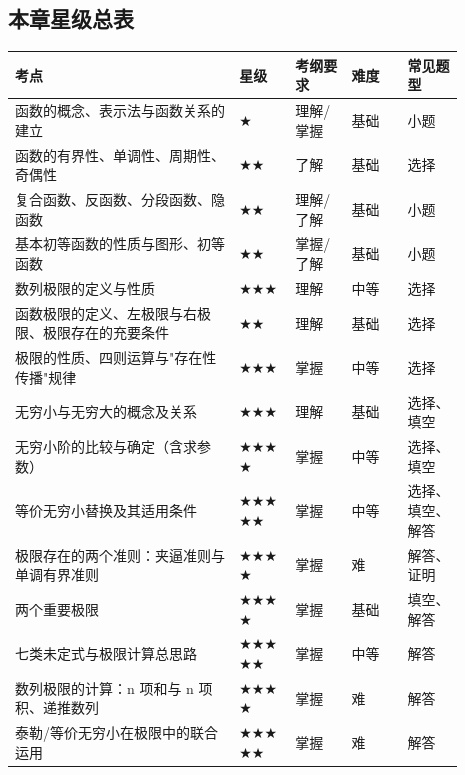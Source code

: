 \documentclass[11pt,openany,UTF8]{ctexbook}
\begin{document}
\subsection*{本章星级总表}

\begingroup\small\setlength{\tabcolsep}{4.0pt}
\begin{longtable}{@{}L{0.4484\linewidth}L{0.1114\linewidth}L{0.1114\linewidth}L{0.1114\linewidth}L{0.1114\linewidth}@{}}
\toprule
\textbf{考点} & \textbf{星级} & \textbf{考纲要求} & \textbf{难度} & \textbf{常见题型} \\
\midrule
\endhead
函数的概念、表示法与函数关系的建立 & $\bigstar$ & 理解/掌握 & 基础 & 小题 \\
函数的有界性、单调性、周期性、奇偶性 & $\bigstar$$\bigstar$ & 了解 & 基础 & 选择 \\
复合函数、反函数、分段函数、隐函数 & $\bigstar$$\bigstar$ & 理解/了解 & 基础 & 小题 \\
基本初等函数的性质与图形、初等函数 & $\bigstar$$\bigstar$ & 掌握/了解 & 基础 & 小题 \\
数列极限的定义与性质 & $\bigstar$$\bigstar$$\bigstar$ & 理解 & 中等 & 选择 \\
函数极限的定义、左极限与右极限、极限存在的充要条件 & $\bigstar$$\bigstar$ & 理解 & 基础 & 选择 \\
极限的性质、四则运算与"存在性传播"规律 & $\bigstar$$\bigstar$$\bigstar$ & 掌握 & 中等 & 选择 \\
无穷小与无穷大的概念及关系 & $\bigstar$$\bigstar$$\bigstar$ & 理解 & 基础 & 选择、填空 \\
无穷小阶的比较与确定（含求参数） & $\bigstar$$\bigstar$$\bigstar$$\bigstar$ & 掌握 & 中等 & 选择、填空 \\
等价无穷小替换及其适用条件 & $\bigstar$$\bigstar$$\bigstar$$\bigstar$$\bigstar$ & 掌握 & 中等 & 选择、填空、解答 \\
极限存在的两个准则：夹逼准则与单调有界准则 & $\bigstar$$\bigstar$$\bigstar$$\bigstar$ & 掌握 & 难 & 解答、证明 \\
两个重要极限 & $\bigstar$$\bigstar$$\bigstar$$\bigstar$ & 掌握 & 基础 & 填空、解答 \\
七类未定式与极限计算总思路 & $\bigstar$$\bigstar$$\bigstar$$\bigstar$$\bigstar$ & 掌握 & 中等 & 解答 \\
数列极限的计算：n 项和与 n 项积、递推数列 & $\bigstar$$\bigstar$$\bigstar$$\bigstar$ & 掌握 & 难 & 解答 \\
泰勒/等价无穷小在极限中的联合运用 & $\bigstar$$\bigstar$$\bigstar$$\bigstar$$\bigstar$ & 掌握 & 难 & 解答 \\

\end{longtable}
\end{document}
